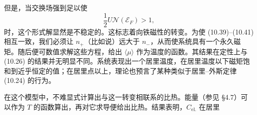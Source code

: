 但是，当交换场强到足以使
\begin{equation*}
\frac{1}{2}U\mathcal{N}(\mathcal{E}_{F})>1,
\tag{10.43}
\end{equation*}
时，这个形式解显然是不稳定的。这标志着向铁磁性的转变。为使 (10.39)–(10.41) 相互一致，我们必须让 $n_{+}$（比如说）远大于 $n_{-}$，从而使系统具有一个永久磁矩。随后便可数值求解这些方程，给出 $\langle\mu\rangle$ 作为温度的函数。其结果在定性上与 (10.26) 的结果并无明显不同。系统表现出一个居里温度，在居里温度以下磁矩饱和到近乎恒定的值；在居里点以上，理论也预言了某种类似于居里–外斯定律 (10.24) 的行为。

在这个模型中，不难显式计算出与这一转变相联系的比热。能量（参见 §4.7）可以作为 $T$ 的函数算出，再对它求导便给出比热。结果表明，$C_{\mathrm{el.}}$ 在居里